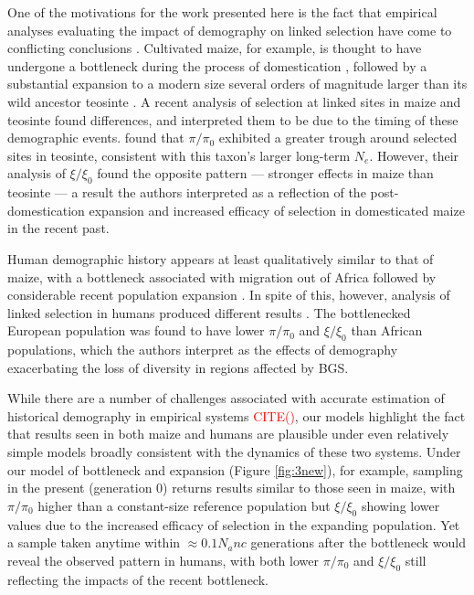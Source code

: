 \documentclass[9pt,twocolumn,twoside]{rilabRxiv}
\newcommand{\citex}[1]{{\small \textcolor{red}{CITE(#1)}}}
\begin{document}
One of the motivations for the work presented here is the fact that empirical analyses evaluating the impact of demography on linked selection have come to conflicting conclusions \citep{torres2018human, beissinger2016recent}.
Cultivated maize, for example, is thought to have undergone a bottleneck during the process of domestication \citep{eyre1998investigation,tenaillon2004selection,wright2005effects}, followed by a substantial expansion to a modern size several orders of magnitude larger than its wild ancestor teosinte \citep{beissinger2016recent, bellon2018evolutionary}.
A recent analysis of selection at linked sites in  maize and teosinte found differences, and interpreted them to be due to the timing of these demographic events.
\citet{beissinger2016recent} found that $\pi/\pi_0$ exhibited a greater trough around selected sites in teosinte, consistent with this taxon's larger long-term $N_e$.
However, their analysis of $\xi/\xi_0$ found the opposite pattern --- stronger effects in maize than teosinte --- a result the authors interpreted as a reflection of the post-domestication expansion and increased efficacy of selection in domesticated maize in the recent past.

Human demographic history appears at least qualitatively similar to that of maize, with a bottleneck associated with migration out of Africa followed by considerable recent population expansion \citep{tennessen2012evolution}.
In spite of this, however, analysis of linked selection in humans produced different results \citep{torres2018human}.
The bottlenecked European population was found to have lower $\pi/\pi_0$ and $\xi/\xi_0$ than African populations, which the authors interpret as the effects of demography exacerbating the loss of diversity in regions affected by BGS.

While there are a number of challenges associated with accurate estimation of historical demography in empirical systems \citex{}, our models highlight the fact that  results seen in both maize and humans are plausible  under even relatively simple models broadly consistent with the dynamics of these two systems.
Under our model of bottleneck and expansion (Figure \ref{fig:3new}), for example, sampling in the present (generation 0) returns results similar to those seen in maize, with $\pi/\pi_0$ higher than a constant-size reference population but $\xi/\xi_0$ showing lower values due to the increased efficacy of selection in the expanding population.
Yet a sample taken anytime within $\approx 0.1N_anc$ generations after the bottleneck would reveal the observed pattern in humans, with both lower $\pi/\pi_0$ and $\xi/\xi_0$ still reflecting the impacts of the recent bottleneck.
\end{document}
